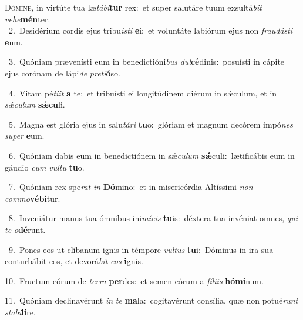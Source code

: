 \lettrine{\initial\textcolor{\initialcolor}{D}}{ómine,} in virtúte tua læ\-\textit{tá}\-\textit{bi}\textbf{tur} rex:~\star et super salutáre tuum exsultá\textit{bit} \textit{ve}\-\textit{he}\textbf{mén}ter.\\
{\numbfont\textcolor{\numbcolor}{~2.}}~Desidérium cordis ejus tribu\-\textit{ís}\-\textit{ti} \textbf{e}\-i:~\star et voluntáte labiórum ejus non \textit{frau}\-\textit{dás}\textit{ti} \textbf{e}\-um.\par
{\numbfont\textcolor{\numbcolor}{~3.}}~Quóniam prævenísti eum in benedictióni\textit{bus} \textit{dul}\-\textbf{cé}dinis:~\star posuísti in cápite ejus corónam de lápi\textit{de} \textit{pre}\-\textit{ti}\textbf{ó}so.\par
{\numbfont\textcolor{\numbcolor}{~4.}}~Vitam pé\-\textit{ti}\-\textit{it} \textbf{a} te:~\star et tribuísti ei longitúdinem diérum in sǽculum, et in \textit{sǽ}\-\textit{cu}\textit{lum} \textbf{sǽ}\-\textbf{cu}li.\par
{\numbfont\textcolor{\numbcolor}{~5.}}~Magna est glória ejus in salu\-\textit{tá}\-\textit{ri} \textbf{tu}\-o:~\star glóriam et magnum decórem impó\textit{nes} \textit{su}\-\textit{per} \textbf{e}\-um.\par
{\numbfont\textcolor{\numbcolor}{~6.}}~Quóniam dabis eum in benedictiónem in sǽ\-\textit{cu}\-\textit{lum} \textbf{sǽ}\-culi:~\star lætificábis eum in gáudio \textit{cum} \textit{vul}\-\textit{tu} \textbf{tu}\-o.\par
{\numbfont\textcolor{\numbcolor}{~7.}}~Quóniam rex spe\textit{rat} \textit{in} \textbf{Dó}\-mino:~\star et in misericórdia Altíssimi \textit{non} \textit{com}\-\textit{mo}\textbf{vé}\textbf{bi}tur.\par
{\numbfont\textcolor{\numbcolor}{~8.}}~Inveniátur manus tua ómnibus ini\-\textit{mí}\-\textit{cis} \textbf{tu}\-is:~\star déxtera tua invéniat omnes, \textit{qui} \textit{te} \textit{o}\-\textbf{dé}runt.\par
{\numbfont\textcolor{\numbcolor}{~9.}}~Pones eos ut clíbanum ignis in témpore \textit{vul}\-\textit{tus} \textbf{tu}\-i:~\star Dóminus in ira sua conturbábit eos, et devorá\textit{bit} \textit{e}\-\textit{os} \textbf{i}\-gnis.\par
{\numbfont\textcolor{\numbcolor}{10.}}~Fructum eórum de \textit{ter}\-\textit{ra} \textbf{per}\-des:~\star et semen eórum a \textit{fí}\-\textit{li}\textit{is} \textbf{hó}\-\textbf{mi}num.\par
{\numbfont\textcolor{\numbcolor}{11.}}~Quóniam declinavérunt \textit{in} \textit{te} \textbf{ma}\-la:~\star cogitavérunt consília, quæ non potué\textit{runt} \textit{sta}\-\textit{bi}\textbf{lí}re.\par
